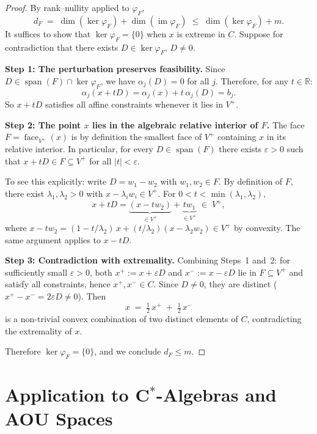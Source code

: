 \documentclass[11pt,a4paper]{article}
\theoremstyle{definition}
\newcommand{\R}{\mathbb{R}}
\newcommand{\spn}{\operatorname{span}}
\newcommand{\face}{\operatorname{face}}
\newcommand{\im}{\operatorname{im}}
\begin{document}
\begin{proof}
By rank--nullity applied to $\varphi_F$,
\[
  d_F
  \;=\; \dim(\ker \varphi_F) + \dim(\im \varphi_F)
  \;\leq\; \dim(\ker \varphi_F) + m.
\]
It suffices to show that $\ker\varphi_F = \{0\}$ when $x$ is extreme
in $C$.  Suppose for contradiction that there exists
$D \in \ker\varphi_F$, $D \neq 0$.

\medskip
\noindent\textbf{Step 1: The perturbation preserves feasibility.}
Since $D \in \spn(F) \cap \ker\varphi_F$, we have
$\alpha_j(D) = 0$ for all $j$.  Therefore, for any $t \in \R$:
\[
  \alpha_j(x + tD) = \alpha_j(x) + t \,\alpha_j(D) = b_j.
\]
So $x + tD$ satisfies all affine constraints whenever it lies in $V^+$.

\medskip
\noindent\textbf{Step 2: The point $x$ lies in the algebraic relative
interior of $F$.}
The face $F = \face_{V^+}(x)$ is by definition the smallest face of
$V^+$ containing $x$ in its relative interior.  In particular, for
every $D \in \spn(F)$ there exists $\varepsilon > 0$ such that
$x + tD \in F \subseteq V^+$ for all $|t| < \varepsilon$.

To see this explicitly: write $D = w_1 - w_2$ with $w_1, w_2 \in F$.
By definition of $F$, there exist $\lambda_1, \lambda_2 > 0$ with
$x - \lambda_i w_i \in V^+$.  For $0 < t < \min(\lambda_1, \lambda_2)$,
\[
  x + tD = \underbrace{(x - t w_2)}_{\in V^+} + \underbrace{t w_1}_{\in V^+}
  \;\in\; V^+,
\]
where $x - tw_2 = (1 - t/\lambda_2)\,x + (t/\lambda_2)(x - \lambda_2 w_2)
\in V^+$ by convexity.  The same argument applies to $x - tD$.

\medskip
\noindent\textbf{Step 3: Contradiction with extremality.}
Combining Steps~1 and~2: for sufficiently small $\varepsilon > 0$,
both $x^+ := x + \varepsilon D$ and $x^- := x - \varepsilon D$ lie in
$F \subseteq V^+$ and satisfy all constraints, hence $x^+, x^- \in C$.
Since $D \neq 0$, they are distinct ($x^+ - x^- = 2\varepsilon D \neq 0$).
Then
\[
  x \;=\; \tfrac{1}{2}\, x^+ \;+\; \tfrac{1}{2}\, x^-
\]
is a non-trivial convex combination of two distinct elements of $C$,
contradicting the extremality of $x$.

Therefore $\ker\varphi_F = \{0\}$, and we conclude $d_F \leq m$.
\end{proof}

\section{Application to C$^*$-Algebras and AOU Spaces}
\end{document}
